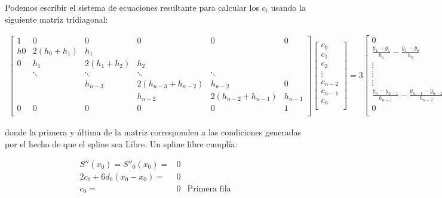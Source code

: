 \newpage

\par Podemos escribir el sistema de ecuaciones resultante para calcular los $c_i$ usando la siguiente matriz tridiagonal: 

\begin{flushleft}

$\begin{array}{l} \begin{bmatrix} 
1 & 0 & 0 & 0 & 0 & 0 \\
h0 & 2(h_0+h_1) & h_1 & \text{} & \text{} & \text{} \\ 
0 & h_1 & 2(h_1+h_2) & h_2 & \text{} & \text{} \\ 
\text{} & \ddots & \ddots & \ddots & \ddots & \text{} \\ 
\text{} & \text{} & h_{n-3} & 2(h_{n-3}+h_{n-2}) & h_{n-2} & 0 \\
\text{} & \text{} & \text{} & h_{n-2} & 2(h_{n-2}+h_{n-1}) & h_{n-1} \\
0 & 0 & 0 & 0 & 0 & 1 \\
\end{bmatrix} 
\begin{bmatrix} c_0 \\ c_1 \\ c_2 \\ \vdots \\ c_{n-2} \\ c_{n-1} \\ c_n \\ \end{bmatrix} 
= 3 \begin{bmatrix} 0 \\ \frac{y_{2}-y_{1}}{h_{1}}  -\frac{y_1-y_{0}}{h_{0}} \\ \vdots \\ \vdots \\ \vdots \\ \frac{y_{n}-y_{n-1}}{h_{n-1}}  -\frac{y_{n-1}-y_{n-2}}{h_{n-2}} \\ 0 \\ \end{bmatrix} \end{array}$

\end{flushleft}

\par donde la primera y última de la matriz corresponden a las condiciones generadas por el hecho de que el spline sea Libre. Un spline libre cumplía: 

\begin{align*}
S''(x_0) = S''_0(x_0) = & 0 \\
2c_0 + 6d_0(x_0 - x_0) = & 0 \\
c_0 = & 0 & \text{Primera fila}
\end{align*}

